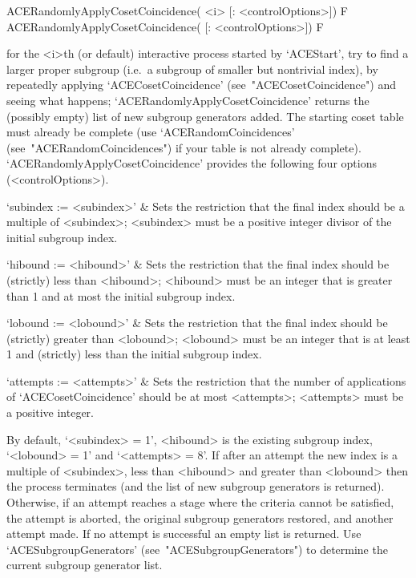 \>ACERandomlyApplyCosetCoincidence( <i> [: <controlOptions>]) F
\>ACERandomlyApplyCosetCoincidence( [: <controlOptions>]) F

for the <i>th (or  default)  interactive  {\ACE}  process  started  by
`ACEStart', try to find a larger proper subgroup (i.e.~a  subgroup  of
smaller   but    nontrivial    index),    by    repeatedly    applying
`ACECosetCoincidence'  (see~"ACECosetCoincidence")  and  seeing   what
happens;  `ACERandomlyApplyCosetCoincidence'  returns  the   (possibly
empty) list of new subgroup generators added. The starting coset table
must    already    be    complete     (use     `ACERandomCoincidences'
(see~"ACERandomCoincidences") if your table is not already  complete).
`ACERandomlyApplyCosetCoincidence' provides the following four options
(<controlOptions>).

\beginitems

\quad`subindex := <subindex>' & 
Sets the restriction that the final index  should  be  a  multiple  of
<subindex>; <subindex> must be  a  positive  integer  divisor  of  the
initial subgroup index.

\quad`hibound := <hibound>' &
Sets the restriction that the final index should  be  (strictly)  less
than <hibound>; <hibound> must be an integer that is  greater  than  1
and at most the initial subgroup index.

\quad`lobound := <lobound>' &
Sets the restriction that the final index should be (strictly) greater
than <lobound>; <lobound> must be an integer that is at  least  1  and
(strictly) less than the initial subgroup index.

\quad`attempts := <attempts>' &
Sets  the   restriction   that   the   number   of   applications   of
`ACECosetCoincidence' should be at most <attempts>; <attempts> must be
a positive integer.

\enditems

By default, `<subindex> =  1',  <hibound>  is  the  existing  subgroup
index, `<lobound> = 1' and `<attempts> = 8'. If after an  attempt  the
new index is a multiple of <subindex>, less than <hibound> and greater
than <lobound> then the  process  terminates  (and  the  list  of  new
subgroup generators is returned). Otherwise, if an attempt  reaches  a
stage where the criteria cannot be satisfied, the attempt is  aborted,
the original subgroup generators restored, and another  attempt  made.
If  no  attempt  is  successful  an  empty  list  is   returned.   Use
`ACESubgroupGenerators' (see~"ACESubgroupGenerators") to determine the
current subgroup generator list.

